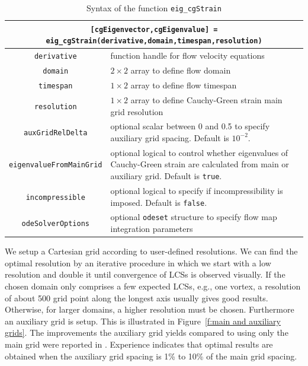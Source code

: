 \documentclass{article}
\begin{document}
\begin{table}
\begin{center}
\begin{tabular}{|c|p{}|}
\hline \hline
\multicolumn{2}{|p{\textwidth}|}{\lstinline![cgEigenvector,cgEigenvalue] = eig_cgStrain(derivative,domain,timespan,resolution)!}\\
\hline
\lstinline!derivative! & function handle for flow velocity equations\\
\hline
\lstinline!domain! & $2 \times 2$ array to define flow domain\\
\hline
\lstinline!timespan! & $1 \times 2$ array to define flow timespan\\
\hline
\lstinline!resolution! & $1 \times 2$ array to define Cauchy-Green strain main grid resolution\\
\hline
\lstinline!auxGridRelDelta! & optional scalar between 0 and 0.5 to specify auxiliary grid spacing. Default is $10^{-2}$.\\
\hline
\lstinline!eigenvalueFromMainGrid! & optional logical to control whether eigenvalues of Cauchy-Green strain are calculated from main or auxiliary grid. Default is \lstinline!true!.\\
\hline
\lstinline!incompressible! & optional logical to specify if incompressibility is imposed. Default is \lstinline!false!.\\
\hline
\lstinline!odeSolverOptions! & optional \lstinline!odeset! structure to specify flow map integration parameters\\
\hline \hline
\end{tabular}
\caption{Syntax of the function \lstinline!eig_cgStrain!}
\label{t:eig_cgStrain syntax}
\end{center}
\end{table}

We setup a Cartesian grid according to user-defined resolutions. We can find the optimal resolution by an iterative procedure in which we start with a low resolution and double it until convergence of LCSs is observed visually. If the chosen domain only comprises a few expected LCSs, e.g., one vortex, a resolution of about 500 grid point along the longest axis usually gives good results. Otherwise, for larger domains, a higher resolution must be chosen. Furthermore an auxiliary grid is setup. This is illustrated in Figure~\ref{f:main and auxiliary grids}. The improvements the auxiliary grid yields compared to using only the main grid were reported in \textcite{farazmand12:_comput_lagran}. Experience indicates that optimal results are obtained when the auxiliary grid spacing is 1\% to 10\% of the main grid spacing.
\end{document}
